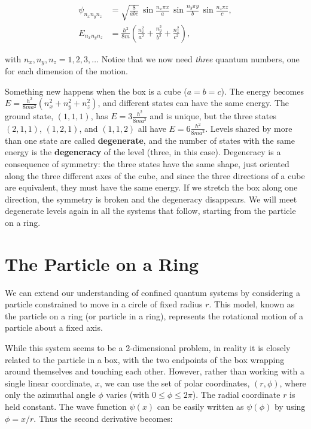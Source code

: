 \documentclass[
  english,
  9pt,
]{extbook}
\theoremstyle{definition}
\theoremstyle{definition}
\theoremstyle{definition}
\theoremstyle{definition}
\theoremstyle{remark}
\begin{document}
\begin{equation}
\begin{aligned}
\psi_{n_x n_y n_z} &= \sqrt{\frac{8}{abc}}\,\sin\frac{n_x\pi x}{a}\,\sin\frac{n_y\pi y}{b}\,\sin\frac{n_z\pi z}{c}, \\
E_{n_x n_y n_z} &= \frac{h^2}{8m}\left(\frac{n_x^2}{a^2}+\frac{n_y^2}{b^2}+\frac{n_z^2}{c^2}\right),
\end{aligned}
\label{eq:PIB3D2}
\end{equation}

with \(n_x,n_y,n_z=1,2,3,\ldots\) Notice that we now need \emph{three} quantum numbers, one for each dimension of the motion.

Something new happens when the box is a cube (\(a=b=c\)). The energy becomes \(E=\frac{h^2}{8ma^2}\left(n_x^2+n_y^2+n_z^2\right)\), and different states can have the same energy. The ground state, \((1,1,1)\), has \(E=3\frac{h^2}{8ma^2}\) and is unique, but the three states \((2,1,1)\), \((1,2,1)\), and \((1,1,2)\) all have \(E=6\frac{h^2}{8ma^2}\). Levels shared by more than one state are called \textbf{degenerate}, and the number of states with the same energy is the \textbf{degeneracy} of the level (three, in this case). Degeneracy is a consequence of symmetry: the three states have the same shape, just oriented along the three different axes of the cube, and since the three directions of a cube are equivalent, they must have the same energy. If we stretch the box along one direction, the symmetry is broken and the degeneracy disappears. We will meet degenerate levels again in all the systems that follow, starting from the particle on a ring.

\section{The Particle on a Ring}\label{the-particle-on-a-ring}

We can extend our understanding of confined quantum systems by considering a particle constrained to move in a circle of fixed radius \(r\). This model, known as the particle on a ring (or particle in a ring), represents the rotational motion of a particle about a fixed axis.

While this system seems to be a 2-dimensional problem, in reality it is closely related to the particle in a box, with the two endpoints of the box wrapping around themselves and touching each other. However, rather than working with a single linear coordinate, \(x\), we can use the set of polar coordinates, \((r,\phi)\), where only the azimuthal angle \(\phi\) varies (with \(0 \leq \phi \leq 2\pi\)). The radial coordinate \(r\) is held constant. The wave function \(\psi(x)\) can be easily written as \(\psi(\phi)\) by using \(\phi=x/r\). Thus the second derivative becomes:
\end{document}
